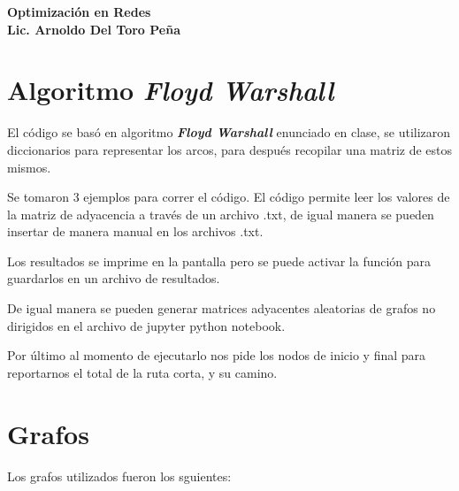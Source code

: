 \documentclass{report}
\newcommand{\war}{ \textit{{\bfseries{Floyd Warshall}}} }
\begin{document}
\begin{center}
  {  \bfseries \LARGE Optimización en Redes} \\
{ \bfseries \Large Lic. Arnoldo Del Toro Peña }
\end{center}
\section*{Algoritmo \war} 

El código se basó en algoritmo \war enunciado en clase, se utilizaron diccionarios para representar los arcos, para después recopilar una matriz de estos mismos.

Se tomaron 3 ejemplos para correr el código. El código permite leer los valores de la matriz de adyacencia a través de un archivo .txt, de igual manera se pueden insertar de manera manual en los archivos .txt.

Los resultados se imprime en la pantalla pero se puede activar la función para guardarlos en un archivo de resultados.

De igual manera se pueden generar matrices adyacentes aleatorias de grafos no dirigidos en el archivo de jupyter python notebook.

Por último al momento de ejecutarlo nos pide los nodos de inicio y final para reportarnos el total de la ruta corta, y su camino.

\section*{Grafos}

Los grafos utilizados fueron los sguientes:
\end{document}
